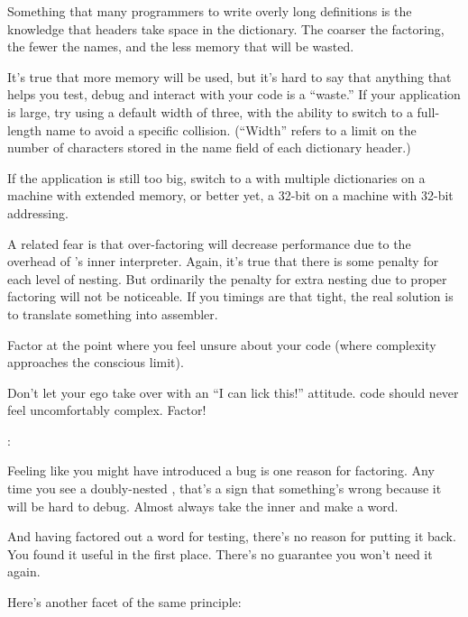 Something that many \Forth{} programmers to write overly long
definitions is the knowledge that headers take space in the
dictionary. The coarser the factoring, the fewer the names, and the
less memory that will be wasted.

It's true that more memory will be used, but it's hard to say that
anything that helps you test, debug and interact with your code is a
``waste.'' If your application is large, try using a default width of
three, with the ability to switch to a full-length name to avoid a
specific collision. (``Width'' refers to a limit on the number of
characters stored in the name field of each dictionary header.)

If the application is still too big, switch to a \Forth{} with
multiple dictionaries on a machine with extended memory, or better
yet, a 32-bit \Forth{} on a machine with 32-bit addressing.

A related fear is that over-factoring will decrease performance due to
the overhead of \Forth{}'s inner interpreter. Again, it's true that
there is some penalty for each level of nesting. But ordinarily the
penalty for extra nesting due to proper factoring will not be
noticeable. If you timings are that tight, the real solution is to
translate something into assembler.

\begin{tip}
Factor at the point where you feel unsure about your code (where
complexity approaches the conscious limit).
\end{tip}
Don't let your ego take over with an ``I can lick this!'' attitude.
\Forth{} code should never feel uncomfortably complex. Factor!

\begin{interview}
:

\begin{tfquot}
Feeling like you might have introduced a bug is one reason for
factoring. Any time you see a doubly-nested , that's a
sign that something's wrong because it will be hard to debug. Almost
always take the inner  and make a word.

And having factored out a word for testing, there's no reason for
putting it back. You found it useful in the first place. There's no
guarantee you won't need it again.
\end{tfquot}
\end{interview}
Here's another facet of the same principle:

